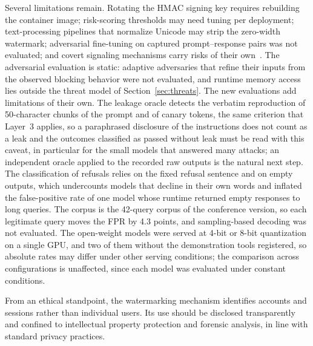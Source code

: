 Several limitations remain. Rotating the HMAC signing key requires rebuilding the container image; risk-scoring thresholds may need tuning per deployment; text-processing pipelines that normalize Unicode may strip the zero-width watermark; adversarial fine-tuning on captured prompt--response pairs was not evaluated; and covert signaling mechanisms carry risks of their own~\cite{stegocollusion2024}. The adversarial evaluation is static: adaptive adversaries that refine their inputs from the observed blocking behavior were not evaluated, and runtime memory access lies outside the threat model of Section~\ref{sec:threats}. The new evaluations add limitations of their own. The leakage oracle detects the verbatim reproduction of 50-character chunks of the prompt and of canary tokens, the same criterion that Layer~3 applies, so a paraphrased disclosure of the instructions does not count as a leak and the outcomes classified as passed without leak must be read with this caveat, in particular for the small models that answered many attacks; an independent oracle applied to the recorded raw outputs is the natural next step. The classification of refusals relies on the fixed refusal sentence and on empty outputs, which undercounts models that decline in their own words and inflated the false-positive rate of one model whose runtime returned empty responses to long queries. The corpus is the 42-query corpus of the conference version, so each legitimate query moves the FPR by 4.3 points, and sampling-based decoding was not evaluated. The open-weight models were served at 4-bit or 8-bit quantization on a single GPU, and two of them without the demonstration tools registered, so absolute rates may differ under other serving conditions; the comparison across configurations is unaffected, since each model was evaluated under constant conditions.

From an ethical standpoint, the watermarking mechanism identifies accounts and sessions rather than individual users. Its use should be disclosed transparently and confined to intellectual property protection and forensic analysis, in line with standard privacy practices.
